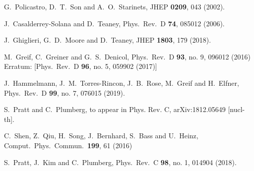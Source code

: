 \begin{thebibliography}{99}
  G.~Policastro, D.~T.~Son and A.~O.~Starinets,
  JHEP {\bf 0209}, 043 (2002).

  J.~Casalderrey-Solana and D.~Teaney,
  Phys.\ Rev.\ D {\bf 74}, 085012 (2006).

  J.~Ghiglieri, G.~D.~Moore and D.~Teaney,
  JHEP {\bf 1803}, 179 (2018).
  
  
  M.~Greif, C.~Greiner and G.~S.~Denicol,
  Phys.\ Rev.\ D {\bf 93}, no. 9, 096012 (2016)
  Erratum: [Phys.\ Rev.\ D {\bf 96}, no. 5, 059902 (2017)]
  
  J.~Hammelmann, J.~M.~Torres-Rincon, J.~B.~Rose, M.~Greif and H.~Elfner,
  Phys.\ Rev.\ D {\bf 99}, no. 7, 076015 (2019).

  S.~Pratt and C.~Plumberg,
  to appear in Phys. Rev. C, arXiv:1812.05649 [nucl-th].

  C.~Shen, Z.~Qiu, H.~Song, J.~Bernhard, S.~Bass and U.~Heinz,
  Comput.\ Phys.\ Commun.\  {\bf 199}, 61 (2016)

  S.~Pratt, J.~Kim and C.~Plumberg,
  Phys.\ Rev.\ C {\bf 98}, no. 1, 014904 (2018).


\end{thebibliography}
